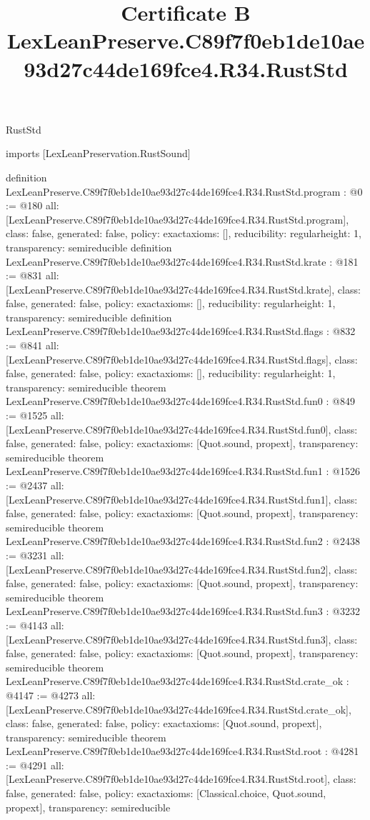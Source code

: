 \begin{lexlean}{RustStd}
\title{Certificate B LexLeanPreserve.C89f7f0eb1de10ae93d27c44de169fce4.R34.RustStd}
\begin{coremodule}
imports [LexLeanPreservation.RustSound]

definition LexLeanPreserve.C89f7f0eb1de10ae93d27c44de169fce4.R34.RustStd.program : @0 := @180 {
  all: [LexLeanPreserve.C89f7f0eb1de10ae93d27c44de169fce4.R34.RustStd.program],
  class: false,
  generated: false,
  policy: exact{axioms: []},
  reducibility: regular{height: 1},
  transparency: semireducible
}
definition LexLeanPreserve.C89f7f0eb1de10ae93d27c44de169fce4.R34.RustStd.krate : @181 := @831 {
  all: [LexLeanPreserve.C89f7f0eb1de10ae93d27c44de169fce4.R34.RustStd.krate],
  class: false,
  generated: false,
  policy: exact{axioms: []},
  reducibility: regular{height: 1},
  transparency: semireducible
}
definition LexLeanPreserve.C89f7f0eb1de10ae93d27c44de169fce4.R34.RustStd.flags : @832 := @841 {
  all: [LexLeanPreserve.C89f7f0eb1de10ae93d27c44de169fce4.R34.RustStd.flags],
  class: false,
  generated: false,
  policy: exact{axioms: []},
  reducibility: regular{height: 1},
  transparency: semireducible
}
theorem LexLeanPreserve.C89f7f0eb1de10ae93d27c44de169fce4.R34.RustStd.fun0 : @849 := @1525 {
  all: [LexLeanPreserve.C89f7f0eb1de10ae93d27c44de169fce4.R34.RustStd.fun0],
  class: false,
  generated: false,
  policy: exact{axioms: [Quot.sound, propext]},
  transparency: semireducible
}
theorem LexLeanPreserve.C89f7f0eb1de10ae93d27c44de169fce4.R34.RustStd.fun1 : @1526 := @2437 {
  all: [LexLeanPreserve.C89f7f0eb1de10ae93d27c44de169fce4.R34.RustStd.fun1],
  class: false,
  generated: false,
  policy: exact{axioms: [Quot.sound, propext]},
  transparency: semireducible
}
theorem LexLeanPreserve.C89f7f0eb1de10ae93d27c44de169fce4.R34.RustStd.fun2 : @2438 := @3231 {
  all: [LexLeanPreserve.C89f7f0eb1de10ae93d27c44de169fce4.R34.RustStd.fun2],
  class: false,
  generated: false,
  policy: exact{axioms: [Quot.sound, propext]},
  transparency: semireducible
}
theorem LexLeanPreserve.C89f7f0eb1de10ae93d27c44de169fce4.R34.RustStd.fun3 : @3232 := @4143 {
  all: [LexLeanPreserve.C89f7f0eb1de10ae93d27c44de169fce4.R34.RustStd.fun3],
  class: false,
  generated: false,
  policy: exact{axioms: [Quot.sound, propext]},
  transparency: semireducible
}
theorem LexLeanPreserve.C89f7f0eb1de10ae93d27c44de169fce4.R34.RustStd.crate_ok : @4147 := @4273 {
  all: [LexLeanPreserve.C89f7f0eb1de10ae93d27c44de169fce4.R34.RustStd.crate_ok],
  class: false,
  generated: false,
  policy: exact{axioms: [Quot.sound, propext]},
  transparency: semireducible
}
theorem LexLeanPreserve.C89f7f0eb1de10ae93d27c44de169fce4.R34.RustStd.root : @4281 := @4291 {
  all: [LexLeanPreserve.C89f7f0eb1de10ae93d27c44de169fce4.R34.RustStd.root],
  class: false,
  generated: false,
  policy: exact{axioms: [Classical.choice, Quot.sound, propext]},
  transparency: semireducible
}


\end{coremodule}
\end{lexlean}
